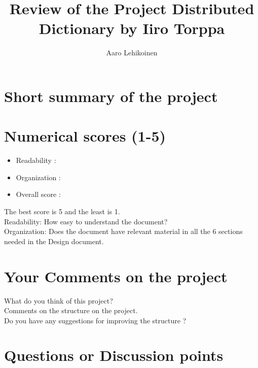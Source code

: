 \documentclass{article}
\begin{document}
\title{Review of the Project Distributed Dictionary by Iiro Torppa}
\author{Aaro Lehikoinen} 
\maketitle
\section{Short summary of the project}

\section{Numerical scores (1-5)}


\begin{itemize}
\item Readability : 
\item Organization : 
\item Overall score : 
\end{itemize}

\noindent The best score is 5 and the least is 1.\\
Readability: How easy to understand the document? \\
Organization: Does the document have relevant material in all the 6 sections needed in  the Design document.\\

\section{Your Comments on the project}
What do you think of this project?\\
Comments on the structure on the project.\\
Do you have any suggestions for improving the structure ? \\ 


\section{Questions or Discussion points}
\end{document}
